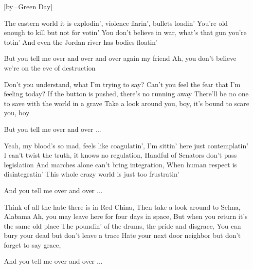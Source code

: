 





[by=Green Day]





\beginverse
The eastern world it is explodin', violence flarin', bullets loadin'
You're old enough to kill but not for votin'
You don't believe in war, what's that gun you're totin'
And even the Jordan river has bodies floatin'
\endverse

\beginchorus
But you tell me over and over and over again my friend
Ah, you don't believe we're on the eve of destruction
\endchorus

\beginverse
Don't you understand, what I'm trying to say?
Can't you feel the fear that I'm feeling today?
If the button is pushed, there's no running away
There'll be no one to save with the world in a grave
Take a look around you, boy, it's bound to scare you, boy
\endverse

\beginchorus
But you tell me over and over ...
\endchorus

\beginverse
Yeah, my blood's so mad, feels like coagulatin', I'm sittin' here just contemplatin'
I can't twist the truth, it knows no regulation, Handful of Senators don't pass legislation
And marches alone can't bring integration, When human respect is disintegratin'
This whole crazy world is just too frustratin'
\endverse

\beginchorus
And you tell me over and over ...
\endchorus

\beginverse
Think of all the hate there is in Red China, Then take a look around to Selma, Alabama
Ah, you may leave here for four days in space, But when you return it's the same old place
The poundin' of the drums, the pride and disgrace, You can bury your dead but don't leave a trace
Hate your next door neighbor but don't forget to say grace,
\endverse

\beginchorus
And you tell me over and over ...
\endchorus



\endsong
